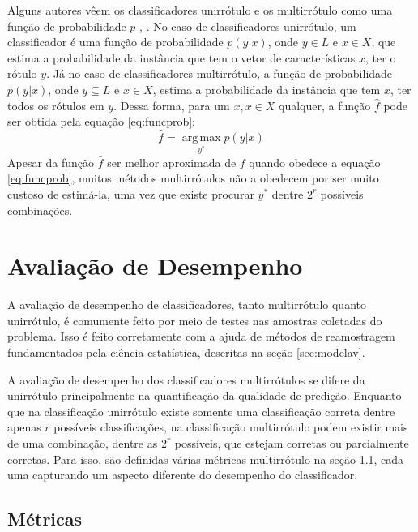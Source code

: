 Alguns autores vêem os classificadores unirrótulo e os multirrótulo como uma função de probabilidade $p$ \cite{mcc2012}, \cite{pcc2010}.
No caso de classificadores unirrótulo, um classificador é uma função de probabilidade $p(y|x)$,
onde $y \in L$ e $x \in X$,
que estima a probabilidade da instância que tem o vetor de características $x$, ter o rótulo $y$.
Já no caso de classificadores multirrótulo, a função de probabilidade $p(y|x)$, onde $y \subseteq L$ e $x \in X$,
estima a probabilidade da instância que tem $x$, ter todos os rótulos em $y$.
Dessa forma, para um $x,x\in X$ qualquer, a função $\hat{f}$
pode ser obtida pela equação \ref{eq:funcprob}:
\begin{equation} \label{eq:funcprob}
 \hat{f}=\operatorname*{arg\,max}_{y^*} p(y|x)
\end{equation}
Apesar da função $\hat{f}$ ser melhor aproximada de $f$ quando obedece a equação \ref{eq:funcprob}, 
muitos métodos multirrótulos não a obedecem por ser muito custoso de estimá-la, uma vez que existe
procurar $y^*$ dentre $2^r$ possíveis combinações.



\section{Avaliação de Desempenho}
A avaliação de desempenho de classificadores, tanto multirrótulo quanto unirrótulo, é comumente feito
por meio de testes nas amostras coletadas do problema.
Isso é feito corretamente com a ajuda de métodos de reamostragem fundamentados pela ciência estatística,
descritas na seção \ref{sec:modelav}.

A avaliação de desempenho dos classificadores multirrótulos se difere da unirrótulo principalmente na
quantificação da qualidade de predição. Enquanto que na classificação unirrótulo existe somente uma classificação
correta dentre apenas $r$ possíveis classificações, na classificação multirrótulo podem existir mais de uma combinação, 
dentre as $2^r$ possíveis, que estejam corretas ou parcialmente corretas.
Para isso, são definidas várias métricas multirrótulo na seção \ref{sec:metrics},
cada uma capturando um aspecto diferente do desempenho do classificador. 



\subsection{Métricas}
\label{sec:metrics}

